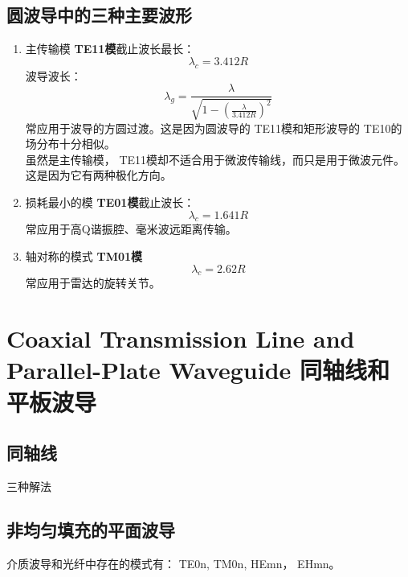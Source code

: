 \subsection{圆波导中的三种主要波形}
    \begin{enumerate}
        \item 主传输模 {\bfseries TE{\scriptsize 11}模}\quad 截止波长最长：
            \begin{equation}
                \lambda_c=3.412R
            \end{equation}
            波导波长：
            \begin{equation}
                 \lambda_g =\frac{\lambda}{\sqrt{1-\left(\frac{\lambda}{3.412R}\right)^2}}
            \end{equation}
            常应用于波导的方圆过渡。这是因为圆波导的 TE{\scriptsize 11}模和矩形波导的 TE{\scriptsize 10}的场分布十分相似。\\
            虽然是主传输模， TE{\scriptsize 11}模却不适合用于微波传输线，而只是用于微波元件。这是因为它有两种极化方向。
        \item 损耗最小的模 {\bfseries TE{\scriptsize 01}模}\quad 截止波长：
            \begin{equation}
                \lambda_c=1.641R
            \end{equation}
            常应用于高Q谐振腔、毫米波远距离传输。
        \item 轴对称的模式 {\bfseries TM{\scriptsize 01}模}\\
            \begin{equation}
                \lambda_c=2.62R
            \end{equation}
            常应用于雷达的旋转关节。
    \end{enumerate}
\section{Coaxial Transmission Line and Parallel-Plate Waveguide 同轴线和平板波导}
\subsection{同轴线}
    三种解法
\subsection{非均匀填充的平面波导}
介质波导和光纤中存在的模式有： TE{\scriptsize 0n}, TM{\scriptsize 0n}, HE{\scriptsize mn}， EH{\scriptsize mn}。

